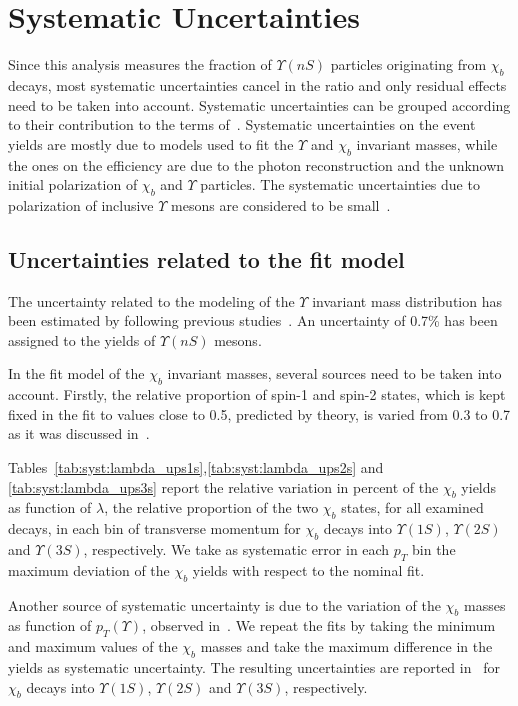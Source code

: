 \section[Systematic]{Systematic Uncertainties}
\label{sec:syst}

Since this analysis measures the fraction of $\Upsilon(nS)$ particles
originating from $\chi_b$ decays, most systematic uncertainties cancel in the
ratio and only residual effects need to be taken into account. Systematic
uncertainties can be grouped according to their contribution to the terms
of~. Systematic uncertainties on the event yields are mostly
due to models used to fit the $\Upsilon$ and $\chi_b$ invariant masses, while the
ones on the efficiency are due to the photon reconstruction and the unknown
initial polarization of $\chi_b$ and $\Upsilon$ particles. The systematic uncertainties due to 
polarization of inclusive $\Upsilon$ mesons are considered to be
small~\cite{Aaij:2013yaa,Aaij:2014nwa}.
 

\subsection{Uncertainties related to the fit model}

The uncertainty related to the modeling of the $\Upsilon$ invariant mass
distribution has been estimated by following previous
studies~\cite{Aaij:2013yaa}. An uncertainty of 0.7\% has been assigned to the
yields of $\Upsilon(nS)$ mesons.

In the fit model of the $\chi_b$ invariant masses, several sources need to be
taken into account. Firstly, the relative proportion of spin-1 and spin-2
states, which is kept fixed in the fit to values close to 0.5, predicted by
theory, is varied from 0.3 to 0.7 as it was discussed in~.


Tables~\ref{tab:syst:lambda_ups1s},\ref{tab:syst:lambda_ups2s} and
\ref{tab:syst:lambda_ups3s} report the relative variation in percent of the
$\chi_b$ yields as function of $\lambda$, the relative proportion of the two
$\chi_b$ states, for all examined decays, in each bin of transverse momentum
for $\chi_b$ decays into $\Upsilon(1S)$, $\Upsilon(2S)$ and $\Upsilon(3S)$,
respectively. We take as systematic error in each $p_T$ bin the maximum
deviation of the $\chi_b$ yields with respect to the nominal fit.

Another source of systematic uncertainty is due to the variation of the $\chi_b$ masses as
function of $p_T(\Upsilon)$, observed in~. We repeat the fits by
taking the minimum and maximum values of the $\chi_b$ masses and take the
maximum difference in the yields as systematic uncertainty. The resulting
uncertainties are reported
in~ for $\chi_b$
decays into $\Upsilon(1S)$, $\Upsilon(2S)$ and $\Upsilon(3S)$, respectively.
 
